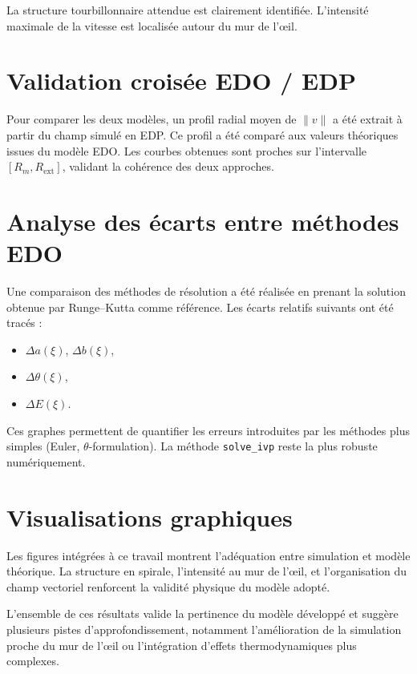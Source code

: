 La structure tourbillonnaire attendue est clairement identifi\'ee. L'intensit\'e maximale de la vitesse est localis\'ee autour du mur de l'\oe il.

\section{Validation crois\'ee EDO / EDP}

Pour comparer les deux mod\`eles, un profil radial moyen de $\|v\|$ a \'et\'e extrait \`a partir du champ simul\'e en EDP. Ce profil a \'et\'e compar\'e aux valeurs th\'eoriques issues du mod\`ele EDO. Les courbes obtenues sont proches sur l'intervalle $[R_m, R_{\text{ext}}]$, validant la coh\'erence des deux approches.

\section{Analyse des \'ecarts entre m\'ethodes EDO}

Une comparaison des m\'ethodes de r\'esolution a \'et\'e r\'ealis\'ee en prenant la solution obtenue par Runge--Kutta comme r\'ef\'erence. Les \'ecarts relatifs suivants ont \'et\'e trac\'es :
\begin{itemize}
    \item $\Delta a(\xi)$, $\Delta b(\xi)$,
    \item $\Delta \theta(\xi)$,
    \item $\Delta E(\xi)$.
\end{itemize}

Ces graphes permettent de quantifier les erreurs introduites par les m\'ethodes plus simples (Euler, $\theta$-formulation). La m\'ethode \texttt{solve\_ivp} reste la plus robuste num\'eriquement.

\section{Visualisations graphiques}

Les figures int\'egr\'ees \`a ce travail montrent l'ad\'equation entre simulation et mod\`ele th\'eorique. La structure en spirale, l'intensit\'e au mur de l'\oe il, et l'organisation du champ vectoriel renforcent la validit\'e physique du mod\`ele adopt\'e.

\medskip

L'ensemble de ces r\'esultats valide la pertinence du mod\`ele d\'evelopp\'e et sugg\`ere plusieurs pistes d'approfondissement, notamment l'am\'elioration de la simulation proche du mur de l'\oe il ou l'int\'egration d'effets thermodynamiques plus complexes.
